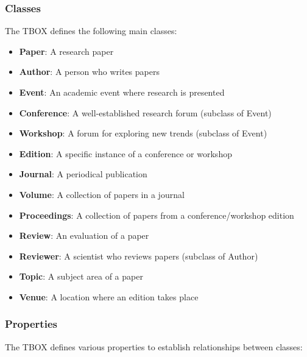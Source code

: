 \documentclass[10pt,a4paper]{article}
\begin{document}
\subsubsection{Classes}
The TBOX defines the following main classes:
\begin{itemize}
    \item \textbf{Paper}: A research paper
    \item \textbf{Author}: A person who writes papers
    \item \textbf{Event}: An academic event where research is presented
    \item \textbf{Conference}: A well-established research forum (subclass of Event)
    \item \textbf{Workshop}: A forum for exploring new trends (subclass of Event)
    \item \textbf{Edition}: A specific instance of a conference or workshop
    \item \textbf{Journal}: A periodical publication
    \item \textbf{Volume}: A collection of papers in a journal
    \item \textbf{Proceedings}: A collection of papers from a conference/workshop edition
    \item \textbf{Review}: An evaluation of a paper
    \item \textbf{Reviewer}: A scientist who reviews papers (subclass of Author)
    \item \textbf{Topic}: A subject area of a paper
    \item \textbf{Venue}: A location where an edition takes place
\end{itemize}

\subsubsection{Properties}
The TBOX defines various properties to establish relationships between classes:
\end{document}
